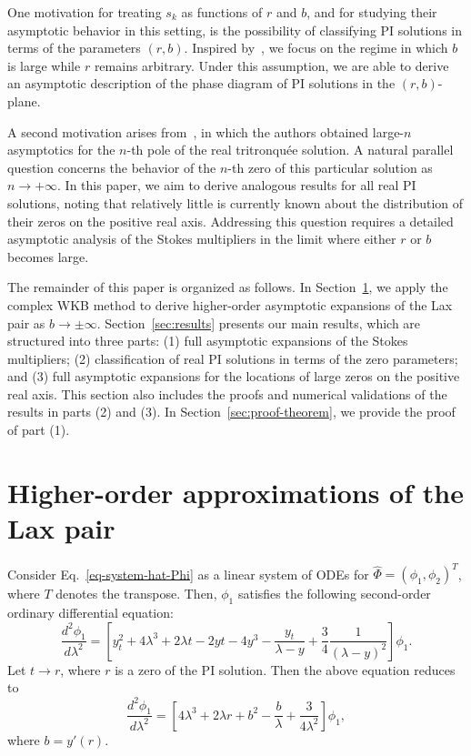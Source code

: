 \documentclass[12pt]{article}
\theoremstyle{plain}
\theoremstyle{definition}
\numberwithin{equation}{section}
\begin{document}
One motivation for treating $s_k$ as functions of $r$ and $b$, and for studying their asymptotic behavior in this setting, is the possibility of classifying PI solutions in terms of the parameters $(r, b)$. Inspired by~\cite{LongLiWang}, we focus on the regime in which $b$ is large while $r$ remains arbitrary. Under this assumption, we are able to derive an asymptotic description of the phase diagram of PI solutions in the $(r, b)$-plane.


A second motivation arises from~\cite{Long-Jiang-Li}, in which the authors obtained large-$n$ asymptotics for the $n$-th pole of the real tritronqu\'ee solution. A natural parallel question concerns the behavior of the $n$-th zero of this particular solution as $n \to +\infty$. In this paper, we aim to derive analogous results for all real PI solutions, noting that relatively little is currently known about the distribution of their zeros on the positive real axis. Addressing this question requires a detailed asymptotic analysis of the Stokes multipliers in the limit where either $r$ or $b$ becomes large.




The remainder of this paper is organized as follows. In Section~\ref{sec:complex}, we apply the complex WKB method \cite{APC, Dunster-2014, Kawai-Takei-2005-book} to derive higher-order asymptotic expansions of the Lax pair as $b \to \pm\infty$. Section~\ref{sec:results} presents our main results, which are structured into three parts:
(1) full asymptotic expansions of the Stokes multipliers;
(2) classification of real PI solutions in terms of the zero parameters; and
(3) full asymptotic expansions for the locations of large zeros on the positive real axis.
This section also includes the proofs and numerical validations of the results in parts (2) and (3). In Section~\ref{sec:proof-theorem}, we provide the proof of part (1).




\section{Higher-order approximations of the Lax pair}\label{sec:complex}

Consider Eq.~\eqref{eq-system-hat-Phi} as a linear system of ODEs for $\widehat{\Phi} = (\phi_1, \phi_2)^T$, where $T$ denotes the transpose. Then, $\phi_{1}$ satisfies the following second-order ordinary differential equation:
\begin{equation}\label{Schrodinger-equation-t-general}
\frac{d^{2}\phi_{1}}{d\lambda^{2}}=\left[y_{t}^{2}+4\lambda^{3}+2\lambda t-2y t-4y^{3}-\frac{y_{t}}{\lambda-y}+\frac{3}{4}\frac{1}{(\lambda-y)^2}\right]\phi_{1}.
\end{equation}
Let $t\to r$, where $r$ is a zero of the PI solution. Then the above equation reduces to
\begin{equation}\label{Schrodinger-equation-reduced-t=a}
\frac{d^{2}\phi_{1}}{d\lambda^{2}}=\left[4\lambda^{3}+2\lambda r+b^2-\frac{b}{\lambda}+\frac{3}{4\lambda^2}\right]\phi_{1},
\end{equation}
where $b=y'(r)$.
\end{document}
